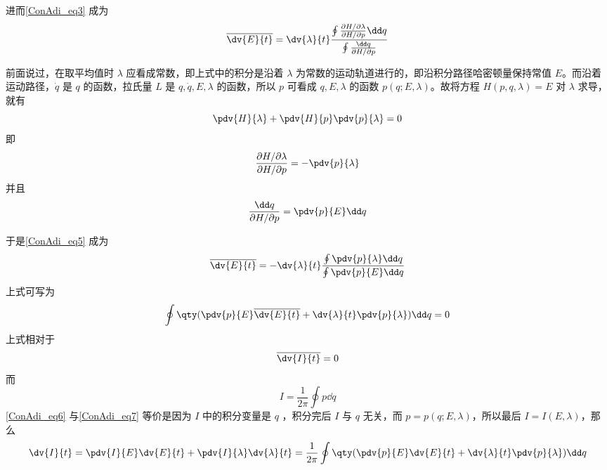 进而\autoref{ConAdi_eq3} 成为
\begin{equation}\label{ConAdi_eq5}
\overline{\dv{E}{t}}=\dv{\lambda}{t}
\frac{\oint\frac{\partial{H}/\partial{\lambda}}{\partial{H}/\partial{p}}\dd q}
{\oint\frac{\dd q}{\partial{H}/\partial{p}}}
\end{equation}

前面说过，在取平均值时 $\lambda$ 应看成常数，即上式中的积分是沿着 $\lambda$ 为常数的运动轨道进行的，即沿积分路径哈密顿量保持常值 $E$。而沿着运动路径，$\dot q$ 是 $q$ 的函数，拉氏量 $L$ 是 $q,\dot q,E,\lambda$ 的函数，所以 $p$ 可看成 $q,E,\lambda$ 的函数 $p(q;E,\lambda)$。故将方程 $H(p,q,\lambda)=E$ 对 $\lambda$ 求导，就有
\begin{equation}
\pdv{H}{\lambda}+\pdv{H}{p}\pdv{p}{\lambda}=0
\end{equation}
即 
\begin{equation}
\frac{\partial{H}/\partial{\lambda}}{\partial{H}/\partial{p}}=-\pdv{p}{\lambda}
\end{equation}
并且
\begin{equation}
\frac{\dd q}{\partial{H}/\partial{p}}=\pdv{p}{E}\dd q
\end{equation}

于是\autoref{ConAdi_eq5} 成为
\begin{equation}
\overline{\dv{E}{t}}=-\dv{\lambda}{t}
\frac{\oint\pdv{p}{\lambda}\dd q}
{\oint\pdv{p}{E}\dd q}
\end{equation}
上式可写为
\begin{equation}\label{ConAdi_eq6}
\oint\qty(\pdv{p}{E}\overline{\dv{E}{t}}+\dv{\lambda}{t}\pdv{p}{\lambda})\dd q=0
\end{equation}
上式相对于
\begin{equation}\label{ConAdi_eq7}
\overline{\dv{I}{t}}=0
\end{equation}
而
\begin{equation}
I=\frac{1}{2\pi}\oint p\dd q
\end{equation}
\autoref{ConAdi_eq6} 与\autoref{ConAdi_eq7} 等价是因为 $I$ 中的积分变量是 $q$ ，积分完后 $I$ 与 $q$ 无关，而 $p=p(q;E,\lambda)$，所以最后 $I=I(E,\lambda)$，那么
\begin{equation}
\dv{I}{t}=\pdv{I}{E}\dv{E}{t}+\pdv{I}{\lambda}\dv{\lambda}{t}=\frac{1}{2\pi}\oint\qty(\pdv{p}{E}\dv{E}{t}+\dv{\lambda}{t}\pdv{p}{\lambda})\dd q
\end{equation}
 